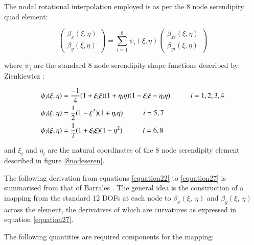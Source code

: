 The nodal rotational interpolation employed is as per the 8 node serendipity quad element:

\begin{equation} 
\begin{pmatrix}
\beta_x (\xi , \eta) \\
\beta_y (\xi , \eta)
\end{pmatrix}
= \sum_{i=1}^8 \psi_i (\xi , \eta) 
\begin{pmatrix}
\beta_{xi} (\xi , \eta) \\
\beta_{yi} (\xi , \eta)
\end{pmatrix}
\label{equation20}
\end{equation}

where $\psi_i$ are the standard 8 node serendipity shape functions described by Zienkiewicz \cite{Zie77}:

\begin{gather} 
	\begin{aligned}
		&\psi_i (\xi , \eta) = \frac{-1}{4} (1 + \xi_i \xi)(1 + \eta_i \eta)(1 - \xi_i \xi - \eta_i \eta)
		\hspace{10mm}
		i = 1, 2, 3, 4 \\
		&\psi_i (\xi , \eta) = \frac{1}{2} (1 - \xi^2)(1 + \eta_i \eta)
		\hspace{10mm}
		i = 5, 7 \\
		&\psi_i (\xi , \eta) = \frac{1}{2} (1 + \xi_i \xi)(1 - \eta^2)
		\hspace{10mm}
		i = 6, 8
		\label{equation21}
	\end{aligned}
\end{gather}

and $\xi_i$ and $\eta_i$ are the natural coordinates of the 8 node serendipity element described in figure \ref{8nodeseren}.

The following derivation from equations \eqref{equation22} to \eqref{equation27} is summarised from that of Barrales \cite{Bar12}. The general idea is the construction of a mapping from the standard 12 DOFs at each node to $\beta_x (\xi,\ \eta)$ and $\beta_y (\xi,\ \eta)$ across the element, the derivatives of which are curvatures as expressed in equation \eqref{equation27}.

The following quantities are required components for the mapping:

